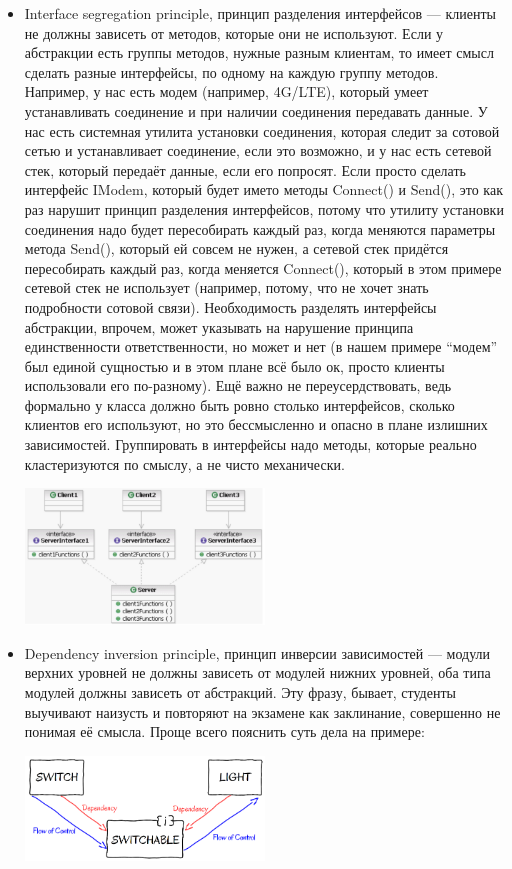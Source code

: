 \documentclass[a5paper]{article}
\begin{document}
\begin{itemize}
	\item Interface segregation principle, принцип разделения интерфейсов --- клиенты не должны зависеть от методов, которые они не используют. Если у абстракции есть группы методов, нужные разным клиентам, то имеет смысл сделать разные интерфейсы, по одному на каждую группу методов. Например, у нас есть модем (например, 4G/LTE), который умеет устанавливать соединение и при наличии соединения передавать данные. У нас есть системная утилита установки соединения, которая следит за сотовой сетью и устанавливает соединение, если это возможно, и у нас есть сетевой стек, который передаёт данные, если его попросят. Если просто сделать интерфейс IModem, который будет името методы Connect() и Send(), это как раз нарушит принцип разделения интерфейсов, потому что утилиту установки соединения надо будет пересобирать каждый раз, когда меняются параметры метода Send(), который ей совсем не нужен, а сетевой стек придётся пересобирать каждый раз, когда меняется Connect(), который в этом примере сетевой стек не использует (например, потому, что не хочет знать подробности сотовой связи). Необходимость разделять интерфейсы абстракции, впрочем, может указывать на нарушение принципа единственности ответственности, но может и нет (в нашем примере ``модем'' был единой сущностью и в этом плане всё было ок, просто клиенты использовали его по-разному). Ещё важно не переусердствовать, ведь формально у класса должно быть ровно столько интерфейсов, сколько клиентов его используют, но это бессмысленно и опасно в плане излишних зависимостей. Группировать в интерфейсы надо методы, которые реально кластеризуются по смыслу, а не чисто механически.
		\begin{center}
			\includegraphics[width=0.5\textwidth]{interfaceSegregationPrinciple.png}
		\end{center}
	\item Dependency inversion principle, принцип инверсии зависимостей --- модули верхних уровней не должны зависеть от модулей нижних уровней, оба типа модулей должны зависеть от абстракций. Эту фразу, бывает, студенты выучивают наизусть и повторяют на экзамене как заклинание, совершенно не понимая её смысла. Проще всего пояснить суть дела на примере:
		\begin{center}
			\includegraphics[width=0.5\textwidth]{dependencyInversionPrinciple.png}
		\end{center}


\end{itemize}
\end{document}
